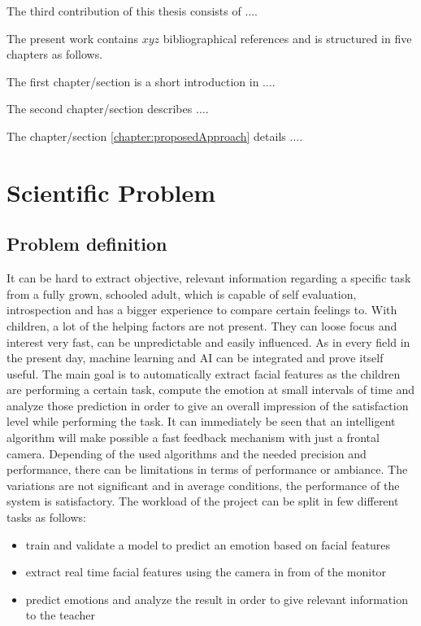 \documentclass[runningheads,a4paper,11pt]{report}
\begin{document}
The third contribution of this thesis consists of $\ldots$.


The present work contains $xyz$ bibliographical references and is structured in five chapters as follows.

The first chapter/section is a short introduction in $\ldots$.

The second chapter/section describes $\ldots$.

The chapter/section \ref{chapter:proposedApproach} details $\ldots$.



\chapter{Scientific Problem}
\label{section:scientificProblem}


\section{Problem definition}
\label{section:problemDefinition}

    It can be hard to extract objective, relevant information regarding a specific task from a fully grown, schooled adult, which is capable of self evaluation, introspection and has a bigger experience to compare certain feelings to. With children, a lot of the helping factors are not present. They can loose focus and interest very fast, can be unpredictable and easily influenced. As in every field in the present day, machine learning and AI can be integrated and prove itself useful. The main goal is to automatically extract facial features as the children are performing a certain task, compute the emotion at small intervals of time and analyze those prediction in order to give an overall impression of the satisfaction level while performing the task. 
    It can immediately be seen that an intelligent algorithm will make possible a fast feedback mechanism with just a frontal camera. Depending of the used algorithms and the needed precision and performance, there can be limitations in terms of performance or ambiance. The variations are not significant and in average conditions, the performance of the system is satisfactory.
    The workload of the project can be split in few different tasks as follows:

\begin{itemize}
    \item train and validate a model to predict an emotion based on facial features
    \item extract real time facial features using the camera in from of the monitor
    \item predict emotions and analyze the result in order to give relevant information to the teacher
\end{itemize}
\end{document}
